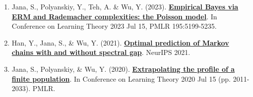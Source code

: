 \documentclass[letterpaper,12pt,oneside]{article}
\theoremstyle{definition}
\begin{document}
			\begin{enumerate}
				\item Jana, S., Polyanskiy, Y., Teh, A. \& Wu, Y. (2023). \href{https://arxiv.org/abs/2307.02070}{\bf Empirical Bayes via ERM and Rademacher complexities: the Poisson model}. In Conference on Learning Theory 2023 Jul 15, PMLR 195:5199-5235.
				
				\item Han, Y., Jana, S., \& Wu, Y. (2021). \href{https://arxiv.org/abs/2106.13947}{\bf Optimal prediction of Markov chains with and without spectral gap}. NeurIPS 2021.
				
				\item Jana, S., Polyanskiy, \& Wu, Y. (2020). \href{https://arxiv.org/abs/2005.10561}{\bf Extrapolating the profile of a finite population}. In Conference on Learning Theory 2020 Jul 15 (pp. 2011-2033). PMLR.
			\end{enumerate}
			
\end{document}
